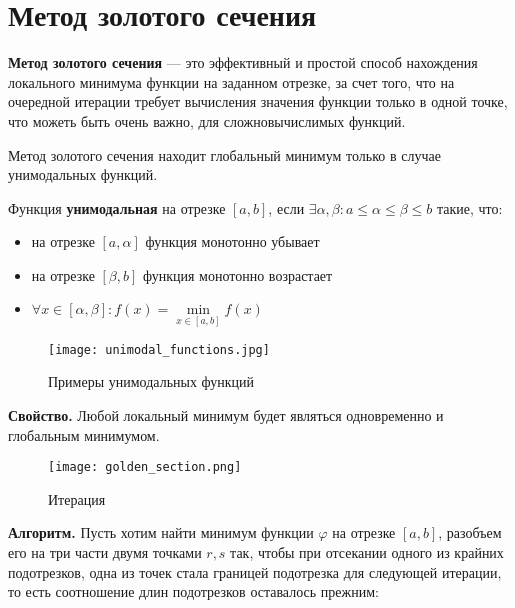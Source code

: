 \section{Метод золотого сечения}

\textbf{Метод золотого сечения} — это эффективный и простой способ нахождения локального минимума функции на заданном отрезке, за счет того, что на очередной итерации требует вычисления значения функции только в одной точке, что можеть быть очень важно, для сложновычислимых функций.

\begin{remark*}
Метод золотого сечения находит глобальный минимум только в случае унимодальных функций.
\end{remark*}

\begin{definition*}
Функция \textbf{унимодальная} на отрезке $[a, b]$, если $\exists \alpha, \beta: a\leq \alpha \leq \beta \leq b$ такие, что:

\begin{itemize}
    \item на отрезке $[a, \alpha]$ функция монотонно убывает
    \item на отрезке $[\beta, b]$ функция монотонно возрастает
    \item $\forall x \in [\alpha, \beta]: f(x) = \min\limits_{x\in[a,b]}f(x)$
\end{itemize}

\begin{figure}[h]
\centering
\texttt{[image: unimodal\_functions.jpg]}
\caption{Примеры унимодальных функций}
\end{figure}
\end{definition*}

\textbf{Свойство.} Любой локальный минимум будет являться одновременно и глобальным минимумом.\\

\begin{wrapfigure}{l}{0.25\textwidth}
\texttt{[image: golden\_section.png]} 
\caption{Итерация}
\label{fig:wrapfig}
\end{wrapfigure}

\textbf{Алгоритм.} Пусть хотим найти минимум функции $\varphi$ на отрезке $[a, b]$, разобъем его на три части двумя точками $r, s$ так, чтобы при отсекании одного из крайних подотрезков, одна из точек стала границей подотрезка для следующей итерации, то есть соотношение длин подотрезков оставалось прежним:\\

